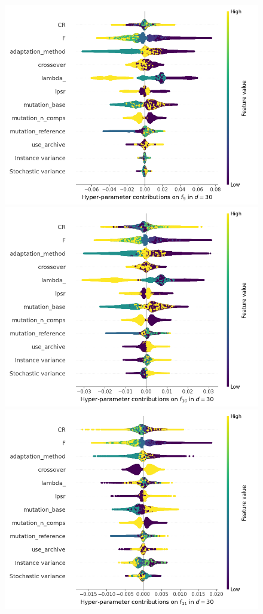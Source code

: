 \begin{figure}[t]
	\includegraphics[height=0.15\textheight,trim=0mm 0mm 30mm 0mm,clip]{de_img_new/img_summary_f9_d30.png}
	\includegraphics[height=0.15\textheight,trim=60mm 0mm 30mm 0mm,clip]{de_img_new/img_summary_f10_d30.png}
	\includegraphics[height=0.15\textheight,trim=60mm 0mm 30mm 0mm,clip]{de_img_new/img_summary_f11_d30.png}

\end{figure}
